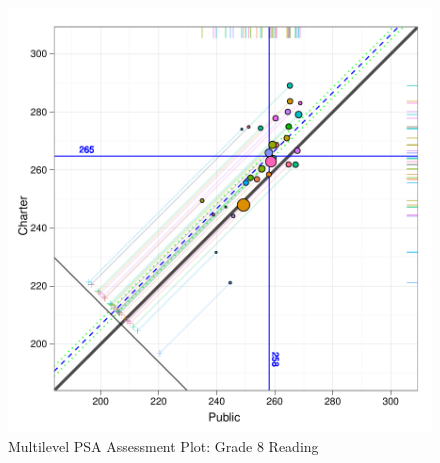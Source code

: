 \documentclass[man,floatsintext]{apa6}
\begin{document}
\begin{figure}[t]
\begin{center}
\includegraphics[width=\textwidth]{../Figures/g8readingtreecircplot.pdf}
\caption{Multilevel PSA Assessment Plot: Grade 8 Reading}
\label{g8readtreecircplot.pdf}
\end{center}
\end{figure}
\end{document}
